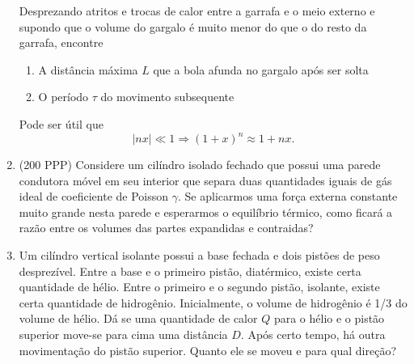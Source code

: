 \begin{enumerate}
        Desprezando atritos e trocas de calor entre a garrafa e o meio externo e
        supondo que o volume do gargalo é muito menor do que o do resto da
        garrafa, encontre
        \begin{enumerate}
            \item
                A distância máxima $L$ que a bola afunda no gargalo após ser
                solta
            \item
                O período $\tau$ do movimento subsequente
        \end{enumerate}
        Pode ser útil que
        $$|nx|\ll1\Rightarrow(1+x)^n\approx1+nx.$$

    \item
        (200 PPP) Considere um cilíndro isolado fechado que possui uma parede
        condutora móvel em seu interior que separa duas quantidades iguais de
        gás ideal de coeficiente de Poisson $\gamma$. Se aplicarmos uma força 
        externa constante muito grande nesta parede e esperarmos o equilíbrio
        térmico, como ficará a razão entre os volumes das partes expandidas e
        contraidas? 

    \item
        Um cilíndro vertical isolante possui a base fechada e dois pistões de
        peso desprezível. Entre a base e o primeiro pistão, diatérmico, existe
        certa quantidade de hélio. Entre o primeiro e o segundo pistão,
        isolante, existe certa quantidade de hidrogênio. Inicialmente, o volume
        de hidrogênio é 1/3 do volume de hélio. Dá se uma quantidade de calor
        $Q$ para o hélio e o pistão superior move-se para cima uma distância
        $D$. Após certo tempo, há outra movimentação do pistão superior. Quanto
        ele se moveu e para qual direção?


\end{enumerate}
